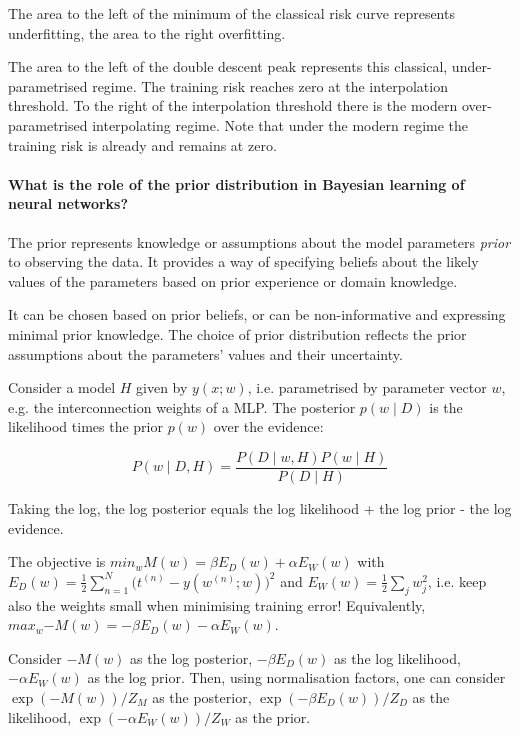 The area to the left of the minimum of the classical risk curve represents underfitting,
the area to the right overfitting.

The area to the left of the double descent peak represents this classical, under-parametrised regime.
The training risk reaches zero at the interpolation threshold.
To the right of the interpolation threshold there is the modern over-parametrised interpolating regime.
Note that under the modern regime the training risk is already and remains at zero.

\paragraph{What is the role of the prior distribution in Bayesian learning of neural networks?}

The prior represents knowledge or assumptions about the model parameters
\textit{prior} to observing the data. It provides a way of specifying
beliefs about the likely values of the parameters based on prior experience or domain knowledge.

It can be chosen based on prior beliefs, or can be non-informative and expressing minimal prior knowledge.
The choice of prior distribution reflects the prior assumptions about the parameters' values and their uncertainty.

Consider a model $H$ given by $y(x; w)$, i.e. parametrised by parameter vector $w$, e.g. the interconnection weights of a MLP.
The posterior $p(w \mid D)$ is the likelihood times the prior $p(w)$ over the evidence:

$$
P(w \mid D, H) = \frac{P(D \mid w, H) P(w \mid H)}{P(D \mid H)}
$$

Taking the log, the log posterior equals the log likelihood + the log prior - the log evidence.

The objective is $min_w{M(w)} = \beta E_D(w) + \alpha E_W(w)$ with
$E_D(w) = \frac{1}{2} \sum_{n=1}^N{\big( t^{(n)} - y(w^{(n)}; w) \big)^2}$
and $E_W(w) = \frac{1}{2} \sum_j{w_j^2}$, i.e. keep also the weights small when minimising training error!
Equivalently, $max_w{- M(w)} = - \beta E_D(w) - \alpha E_W(w)$.

Consider $- M(w)$ as the log posterior,
$- \beta E_D(w)$ as the log likelihood,
$- \alpha E_W(w)$ as the log prior. Then, using normalisation factors, one can consider
$\exp(- M(w) ) / Z_M$ as the posterior,
$\exp(- \beta E_D(w) ) / Z_D$ as the likelihood,
$\exp(- \alpha E_W(w) ) / Z_W$ as the prior.

